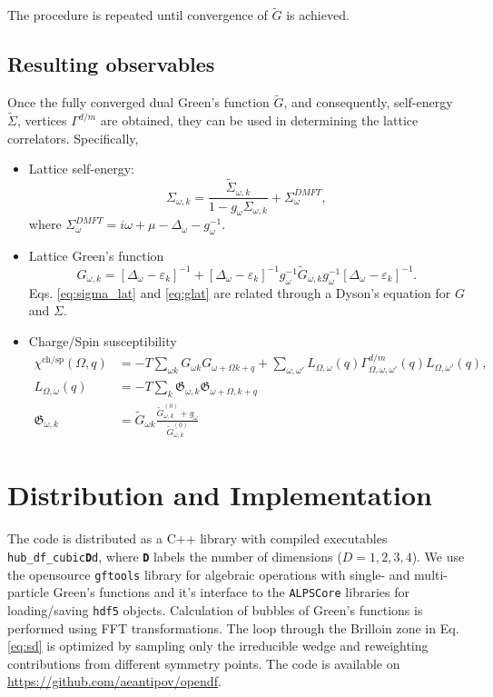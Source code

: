 \documentclass[3p,times,procedia]{elsarticle}
\begin{document}
The procedure is repeated until convergence of $\tilde G$ is achieved. 

\subsection{Resulting observables}
Once the fully converged dual Green's function $\tilde G$, and consequently, self-energy $\tilde \Sigma$, vertices $\Gamma^{d/m}$ are obtained, they can be used in determining the lattice correlators. Specifically, 
\begin{itemize}
\item Lattice self-energy: 
\begin{equation}\label{eq:sigma_lat}
\Sigma_{\omega, k} = \frac{\tilde \Sigma_{\omega, k}}{1 - g_\omega \Sigma_{\omega, k}} + \Sigma^{DMFT}_{\omega},
\end{equation}
where $\Sigma^{DMFT}_{\omega} = i\omega + \mu - \Delta_{\omega} - g_\omega^{-1}$. 
\item Lattice Green's function
\begin{equation}\label{eq:glat}
G_{\omega,k} = \left[\Delta_{\omega} - \varepsilon_{k}\right]^{-1} + \left[\Delta_{\omega} - \varepsilon_{k}\right]^{-1} g_{\omega}^{-1} \tilde G_{\omega, k} g_{\omega}^{-1} \left[\Delta_{\omega} - \varepsilon_{k}\right]^{-1}.
\end{equation}
Eqs. \ref{eq:sigma_lat} and \ref{eq:glat} are related through a Dyson's equation for $G$ and $\Sigma$. 
\item Charge/Spin susceptibility 
\begin{align}
\chi^{\mathrm{ch/sp}} (\Omega, q) & = -T \sum_{\omega k} G_{\omega k} G_{\omega+\Omega k+q} + \sum_{\omega,\omega'} L_{\Omega, \omega}(q) \Gamma^{d/m}_{\Omega,\omega,\omega'}(q) L_{\Omega, \omega'}(q), \\
L_{\Omega, \omega}(q) & = -T \sum_k \mathfrak{G}_{\omega,k} \mathfrak{G}_{\omega + \Omega,k + q} \\
\mathfrak{G}_{\omega,k} & = \tilde G_{\omega k} \frac{\tilde G^{(0)}_{\omega, k} + g_\omega}{\tilde G^{(0)}_{\omega, k}}
\end{align}
\end{itemize}

\section{Distribution and Implementation}
The code is distributed as a C++ library with compiled executables \texttt{hub\_df\_cubic{\bf D}d}, where \texttt{\bf D} labels the number of dimensions ($D=1,2,3,4$). We use the opensource \texttt{gftools} library \cite{gftools} for algebraic operations with single- and multi-particle Green's functions and it's interface to the \texttt{ALPSCore} libraries \cite{ALPSCore} for loading/saving \texttt{hdf5} objects. Calculation of bubbles of Green's functions is performed using FFT transformations. The loop through the Brilloin zone in Eq. \ref{eq:sd} is optimized by sampling only the irreducible wedge and reweighting contributions from different symmetry points. The code is available on \url{https://github.com/aeantipov/opendf}.
\end{document}
